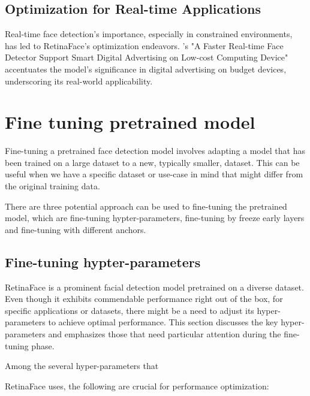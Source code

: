 \documentclass{article}
\begin{document}
\subsection{Optimization for Real-time Applications}
Real-time face detection's importance, especially in constrained environments, has led to RetinaFace's optimization endeavors. \cite{putro2022faster}'s "A Faster Real-time Face Detector Support Smart Digital Advertising on Low-cost Computing Device" accentuates the model's significance in digital advertising on budget devices, underscoring its real-world applicability.

\section{Fine tuning pretrained model}

Fine-tuning a pretrained face detection model involves adapting a model that has been trained on a large dataset to a new, typically smaller, dataset. 
This can be useful when we have a specific dataset or use-case in mind that might differ from the original training data. 

There are three potential approach can be used to fine-tuning the pretrained model,
which are fine-tuning hypter-parameters, fine-tuning by freeze early layers and fine-tuning with different anchors.

\subsection{Fine-tuning hypter-parameters}

RetinaFace is a prominent facial detection model pretrained on a diverse dataset. Even though it exhibits commendable performance right out of the box, for specific applications or datasets, there might be a need to adjust its hyper-parameters to achieve optimal performance. This section discusses the key hyper-parameters and emphasizes those that need particular attention during the fine-tuning phase.

Among the several hyper-parameters that 

RetinaFace uses, the following are crucial for performance optimization:
\end{document}

